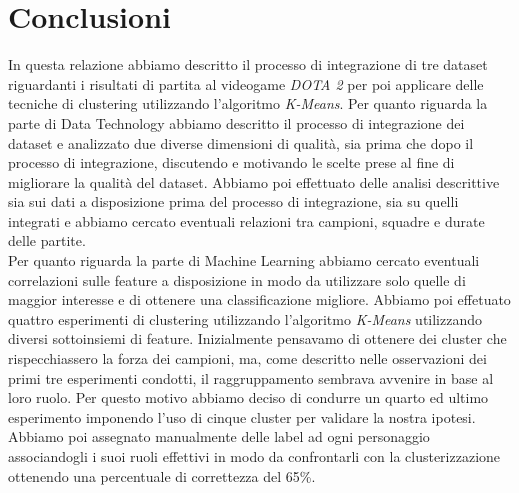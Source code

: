 \documentclass[a4paper,12pt,openany,oneside]{book}
\begin{document}
\chapter{Conclusioni}
In questa relazione abbiamo descritto il processo di integrazione di tre dataset riguardanti i risultati di partita al videogame \textit{DOTA 2} per poi applicare delle tecniche di clustering utilizzando l'algoritmo \textit{K-Means}. Per quanto riguarda la parte di Data Technology abbiamo descritto il processo di integrazione dei dataset e analizzato due diverse dimensioni di qualità, sia prima che dopo il processo di integrazione, discutendo e motivando le scelte prese al fine di migliorare la qualità del dataset. Abbiamo poi effettuato delle analisi descrittive sia sui dati a disposizione prima del processo di integrazione, sia su quelli integrati e abbiamo cercato eventuali relazioni tra campioni, squadre e durate delle partite.
\\[0.8em]
Per quanto riguarda la parte di Machine Learning abbiamo cercato eventuali correlazioni sulle feature a disposizione in modo da utilizzare solo quelle di maggior interesse e di ottenere una classificazione migliore. Abbiamo poi effetuato quattro esperimenti di clustering utilizzando l'algoritmo \textit{K-Means} utilizzando diversi sottoinsiemi di feature. Inizialmente pensavamo di ottenere dei cluster che rispecchiassero la forza dei campioni, ma, come descritto nelle osservazioni dei primi tre esperimenti condotti, il raggruppamento sembrava avvenire in base al loro ruolo. Per questo motivo abbiamo deciso di condurre un quarto ed ultimo esperimento imponendo l'uso di cinque cluster per validare la nostra ipotesi. Abbiamo poi assegnato manualmente delle label ad ogni personaggio associandogli i suoi ruoli effettivi in modo da confrontarli con la clusterizzazione ottenendo una percentuale di correttezza del 65\%.
\end{document}
